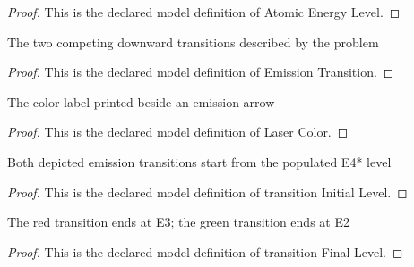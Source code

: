 \begin{proof}
  This is the declared model definition of Atomic Energy Level.
\end{proof}
\begin{definition}
  \label{def:physics:phyx-mini-0537:phyxminiproblems-problemphyxmini0537-emissiontransition}
  The two competing downward transitions described by the problem
\end{definition}
\begin{proof}
  This is the declared model definition of Emission Transition.
\end{proof}
\begin{definition}
  \label{def:physics:phyx-mini-0537:phyxminiproblems-problemphyxmini0537-lasercolor}
  The color label printed beside an emission arrow
\end{definition}
\begin{proof}
  This is the declared model definition of Laser Color.
\end{proof}
\begin{definition}
  \label{def:physics:phyx-mini-0537:phyxminiproblems-problemphyxmini0537-transitioninitiallevel}
  Both depicted emission transitions start from the populated E4* level
\end{definition}
\begin{proof}
  This is the declared model definition of transition Initial Level.
\end{proof}
\begin{definition}
  \label{def:physics:phyx-mini-0537:phyxminiproblems-problemphyxmini0537-transitionfinallevel}
  The red transition ends at E3; the green transition ends at E2
\end{definition}
\begin{proof}
  This is the declared model definition of transition Final Level.
\end{proof}
